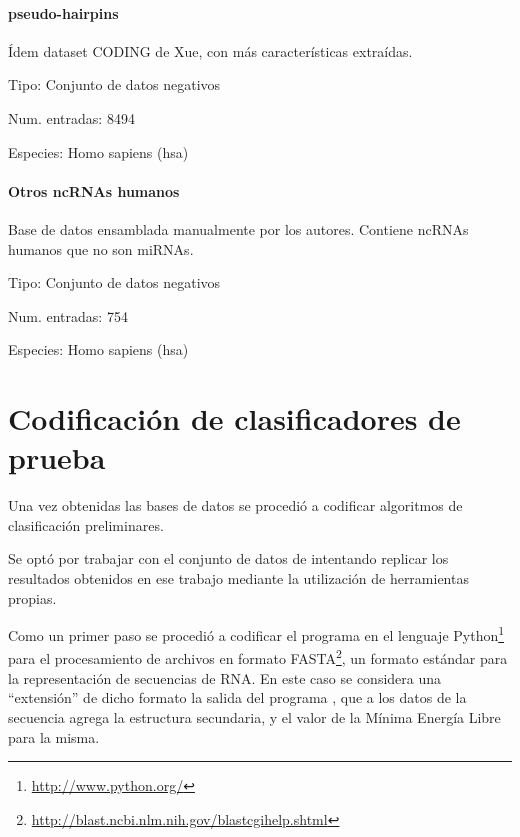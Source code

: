 \documentclass[12pt,bibliography=openstyle,DIV=12,parskip=half-]{scrartcl}
\begin{document}
\paragraph{pseudo-hairpins}
Ídem dataset CODING de Xue, con más características extraídas.
\begin{description*}
\item[Tipo:] Conjunto de datos negativos
\item[Num. entradas:] 8494
\item[Especies:] Homo sapiens (hsa)
\end{description*}
%
\paragraph{Otros ncRNAs humanos}
Base de datos ensamblada manualmente por los autores. Contiene ncRNAs humanos
que no son miRNAs.
\begin{description*}
\item[Tipo:] Conjunto de datos negativos
\item[Num. entradas:] 754
\item[Especies:] Homo sapiens (hsa)
\end{description*}
%
%
%
%
\section{Codificación de clasificadores de prueba}
%
Una vez obtenidas las bases de datos se procedió a codificar
algoritmos de clasificación preliminares.

Se optó por trabajar con el conjunto de datos de \cite{xue}
intentando replicar los resultados obtenidos en ese trabajo mediante
la utilización de herramientas propias.

Como un primer paso se procedió a codificar el programa 
en el lenguaje Python\footnote{\url{http://www.python.org/}}
para el procesamiento de archivos en formato
FASTA\footnote{\url{http://blast.ncbi.nlm.nih.gov/blastcgihelp.shtml}},
un formato estándar para la representación de secuencias de RNA.
En este caso se considera una ``extensión'' de dicho formato
la salida del programa , que a los datos de la secuencia
agrega la estructura secundaria, y el valor de la Mínima Energía Libre
para la misma.
\end{document}
